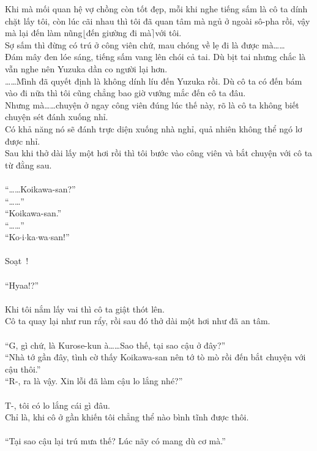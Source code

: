 \documentclass[12pt,a4paper, twosides]{book}
\begin{document}
Khi mà mối quan hệ vợ chồng còn tốt đẹp, mỗi khi nghe tiếng sấm là cô ta dính chặt lấy tôi, còn lúc cãi nhau thì tôi đã quan tâm mà ngủ ở ngoài sô-pha rồi, vậy mà lại đến làm nũng$\lfloor$đến giường đi mà$\rceil$với tôi.\\
Sợ sấm thì đừng có trú ở công viên chứ, mau chóng về lẹ đi là được mà……\\
Đám mây đen lóe sáng, tiếng sấm vang lên chói cả tai. Dù bịt tai nhưng chắc là vẫn nghe nên Yuzuka dần co người lại hơn.\\
……Mình đã quyết định là không dính líu đến Yuzuka rồi. Dù cô ta có đến bám vào đi nữa thì tôi cũng chẳng bao giờ vướng mắc đến cô ta đâu.\\
Nhưng mà……chuyện ở ngay công viên đúng lúc thế này, rõ là cô ta không biết chuyện sét đánh xuống nhỉ.\\
Có khả năng nó sẽ đánh trực diện xuống nhà nghỉ, quả nhiên không thể ngó lơ được nhỉ.\\
Sau khi thở dài lấy một hơi rồi thì tôi bước vào công viên và bắt chuyện với cô ta từ đằng sau.\\
\\
“……Koikawa-san?”\\
“……”\\
“Koikawa-san.”\\
“……”\\
“Ko$\cdot$i$\cdot$ka$\cdot$wa$\cdot$san!”\\
\\
Soạt~!\\
\\
“Hyaa!?”\\
\\
Khi tôi nắm lấy vai thì cô ta giật thót lên.\\
Cô ta quay lại như run rẩy, rồi sau đó thở dài một hơi như đã an tâm.\\
\\
“G, gì chứ, là Kurose-kun à……Sao thế, tại sao cậu ở đây?”\\
“Nhà tớ gần đây, tình cờ thấy Koikawa-san nên tớ tò mò rồi đến bắt chuyện với cậu thôi.”\\
“R-, ra là vậy. Xin lỗi đã làm cậu lo lắng nhé?”\\
\\
T-, tôi có lo lắng cái gì đâu.\\
Chỉ là, khi cô ở gần khiến tôi chẳng thể nào bình tĩnh được thôi.\\
\\
“Tại sao cậu lại trú mưa thế? Lúc nãy có mang dù cơ mà.”\\
\end{document}
